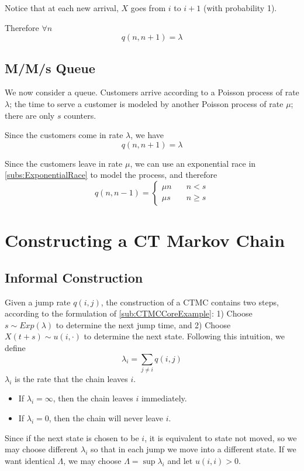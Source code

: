         Notice that at each new arrival, $X$ goes from $i$ to $i+1$ (with probability 1).
        
        Therefore $\forall n$
        \[ q(n, n+1) = \lambda \]

    \subsection{M/M/s Queue}
        We now consider a queue. Customers arrive according to a Poisson process of rate $\lambda$; the time to serve a customer is modeled by another Poisson process of rate $\mu$; there are only $s$ counters.

        Since the customers come in rate $\lambda$, we have
        \[ q(n, n+1) = \lambda \]

        Since the customers leave in rate $\mu$, we can use an exponential race in \ref{subs:ExponentialRace} to model the process, and therefore
        \[ q(n, n-1) = \begin{cases}
            \mu n & \quad n < s\\
            \mu s & \quad n \ge s
        \end{cases} \]


\section{Constructing a CT Markov Chain}
    \subsection{Informal Construction}
        Given a jump rate $q(i,j)$, the construction of a CTMC contains two steps, according to the formulation of \ref{sub:CTMCCoreExample}: 1) Choose $s\sim Exp(\lambda)$ to determine the next jump time, and 2) Choose $X(t+s) \sim u(i,\cdot)$ to determine the next state. Following this intuition, we define
        \[ \lambda_i = \sum_{j \neq i}q(i,j) \]
        $\lambda_i$ is the rate that the chain leaves $i$.
        \begin{itemize}
            \item If $\lambda_i = \infty$, then the chain leaves $i$ immediately.
            \item If $\lambda_i = 0$, then the chain will never leave $i$.
        \end{itemize}
        Since if the next state is chosen to be $i$, it is equivalent to state not moved, so we may choose different $\lambda_i$ so that in each jump we move into a different state. If we want identical $\Lambda$, we may choose $\Lambda = \sup \lambda_i$ and let $u(i,i)>0$.
        
